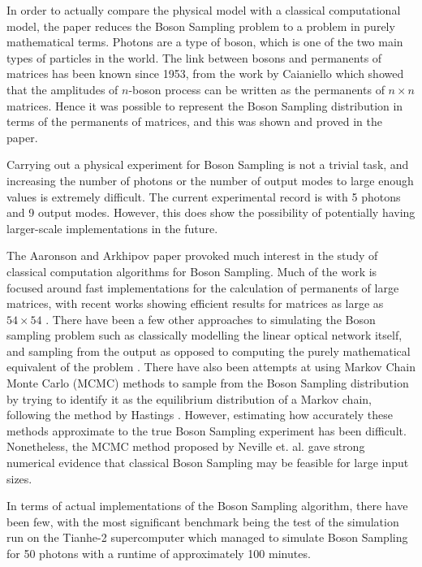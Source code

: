\documentclass[ %
                    author={Manan Vaswani},
                supervisor={Dr. Raphael Clifford},
                    degree={MEng},
                     title={A multi-core CPU implementation of the classical Boson Sampling algorithm},
                  subtitle={},
                      type={},
                      year={2019} ]{dissertation}
\theoremstyle{plain}
\theoremstyle{definition}
\begin{document}
In order to actually compare the physical model with a classical computational model, the paper reduces the Boson Sampling problem to a problem in purely mathematical terms. Photons are a type of boson, which is one of the two main types of particles in the world. The link between bosons and permanents of matrices has been known since 1953, from the work by Caianiello \cite{Caianiello1953} which showed that the amplitudes of $n$-boson process can be written as the permanents of $n \times n$ matrices. Hence it was possible to represent the Boson Sampling distribution in terms of the permanents of matrices, and this was shown and proved in the paper.

Carrying out a physical experiment for Boson Sampling is not a trivial task, and increasing the number of photons or the number of output modes to large enough values is extremely difficult. The current experimental record is with 5 photons and 9 output modes. However, this does show the possibility of potentially having larger-scale implementations in the future.

The Aaronson and Arkhipov paper provoked much interest in the study of classical computation algorithms for Boson Sampling. Much of the work is focused around fast implementations for the calculation of permanents of large matrices, with recent works showing efficient results for matrices as large as $54 \times 54$ \cite{roga2019, lundow2019}. There have been a few other approaches to simulating the Boson sampling problem such as classically modelling the linear optical network itself, and sampling from the output as opposed to computing the purely mathematical equivalent of the problem \cite{rahimi2016}. There have also been attempts at using Markov Chain Monte Carlo (MCMC) methods to sample from the Boson Sampling distribution by trying to identify it as the equilibrium distribution of a Markov chain, following the method by Hastings \cite{hastings1970}. However, estimating how accurately these methods approximate to the true Boson Sampling experiment has been difficult. Nonetheless, the MCMC method proposed by Neville et. al. \cite{neville2017} gave strong numerical evidence that classical Boson Sampling may be feasible for large input sizes.

In terms of actual implementations of the Boson Sampling algorithm, there have been few, with the most significant benchmark being the test of the simulation run on the Tianhe-2 supercomputer \cite{wu2018} which managed to simulate Boson Sampling for 50 photons with a runtime of approximately 100 minutes.
\end{document}
